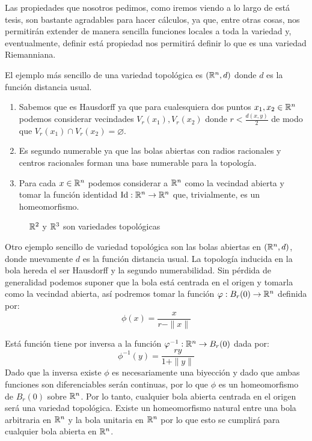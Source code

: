 Las propiedades que nosotros pedimos, como iremos viendo a lo largo de está tesis, son bastante agradables para hacer cálculos, ya que, entre otras cosas, nos permitirán extender de manera sencilla funciones locales a toda la variedad y, eventualmente, definir está propiedad nos permitirá definir lo que es una variedad Riemanniana.


\begin{example}\label{Ex: Variedad Topologica - Espacios Euclidianos}
	El ejemplo más sencillo de una variedad topológica es $(\mathbb{R}^n,d)$ donde $d$ es la función distancia usual.
	\begin{enumerate}
		\item Sabemos que es Hausdorff ya que para cualesquiera dos puntos $x_1,x_2 \in \mathbb{R}^n$ podemos considerar vecindades $V_r(x_1), V_r(x_2)$ donde $r < \frac{d(x,y)}{2}$ de modo que $V_r(x_1) \cap V_r(x_2) = \varnothing$.
		\item Es segundo numerable ya que las bolas abiertas con radios racionales y centros racionales forman una base numerable para la topología.
		\item Para cada $x \in \mathbb{R}^n$ podemos considerar a $\mathbb{R}^n$ como la vecindad abierta y tomar la función identidad $\mathrm{Id}: \mathbb{R}^n \to \mathbb{R}^n$ que, trivialmente, es un homeomorfismo.
	\end{enumerate}
\end{example}

\begin{figure}[h]
	\centering
  
	\caption{$\mathbb{R}^2$ y $\mathbb{R}^3$ son variedades topológicas}
\end{figure}

\begin{example}\label{Ex: Variedad Topologica - Bolas Abiertas}
	Otro ejemplo sencillo de variedad topológica son las bolas abiertas en $(\mathbb{R}^n,d)$, donde nuevamente $d$ es la función distancia usual. La topología inducida en la bola hereda el ser Hausdorff y la segundo numerabilidad. Sin pérdida de generalidad podemos suponer que la bola está centrada en el origen y tomarla como la vecindad abierta, así podremos tomar la función $\varphi: B_r(0) \to \mathbb{R}^n$ definida por:
	\[
		\phi(x) = \frac{x}{r - \|x\|}
	\]

	Está función tiene por inversa a la función $\varphi^{-1}: \mathbb{R}^n \to B_r(0)$ dada por:
	\[ \phi^{-1}(y) = \frac{ry}{1 + \|y\|}
	\]
	Dado que la inversa existe $\phi$ es necesariamente una biyección y dado que ambas funciones son diferenciables serán continuas, por lo que $\phi$ es un homeomorfismo de $B_r(0)$ sobre $\mathbb{R}^n$. Por lo tanto, cualquier bola abierta centrada en el origen será una variedad topológica. Existe un homeomorfismo natural entre una bola arbitraria en $\mathbb{R}^n$ y la bola unitaria en $\mathbb{R}^n$ por lo que esto se cumplirá para cualquier bola abierta en $\mathbb{R}^n$.
\end{example}

